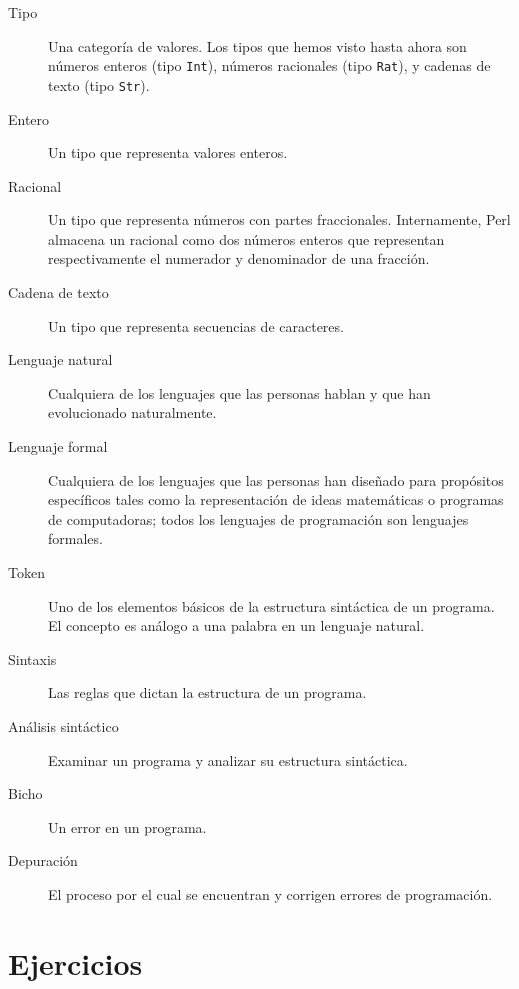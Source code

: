 \begin{description}
\item[Tipo] Una categoría de valores. Los tipos que hemos visto hasta
ahora son números enteros (tipo {\tt Int}), números racionales (tipo {\tt Rat}),
y cadenas de texto (tipo {\tt Str}).

\item[Entero] Un tipo que representa valores enteros.

\item[Racional] Un tipo que representa números con partes fraccionales. 
Internamente, Perl almacena un racional como dos números enteros
que representan respectivamente el numerador y denominador de una 
fracción.

\item[Cadena de texto] Un tipo que representa secuencias de caracteres.

\item[Lenguaje natural]  Cualquiera de los lenguajes que las 
personas hablan y que han evolucionado naturalmente.

\item[Lenguaje formal]  Cualquiera de los lenguajes que las personas
han diseñado para propósitos específicos tales como la representación de 
ideas matemáticas o programas de computadoras; todos los lenguajes de programación
son lenguajes formales.

\item[Token]  Uno de los elementos básicos de la estructura sintáctica de 
un programa. El concepto es análogo a una palabra en un lenguaje natural.

\item[Sintaxis] Las reglas que dictan la estructura de un programa.

\item[Análisis sintáctico] Examinar un programa y analizar su estructura sintáctica.

\item[Bicho] Un error en un programa.

\item[Depuración] El proceso por el cual se encuentran y corrigen errores de programación.

\end{description}


\section{Ejercicios}


